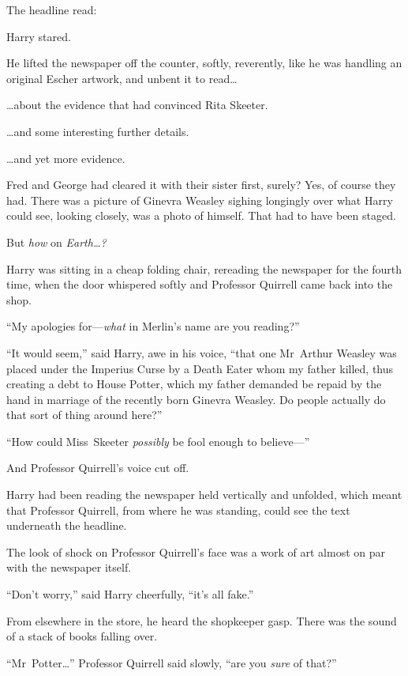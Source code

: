 The headline read:


Harry stared.

He lifted the newspaper off the counter, softly, reverently, like he was handling an original Escher artwork, and unbent it to read…

…about the evidence that had convinced Rita Skeeter.

…and some interesting further details.

…and yet more evidence.

Fred and George had cleared it with their sister first, surely? Yes, of course they had. There was a picture of Ginevra Weasley sighing longingly over what Harry could see, looking closely, was a photo of himself. That had to have been staged.

But \emph{how} on \emph{Earth…?}

Harry was sitting in a cheap folding chair, rereading the newspaper for the fourth time, when the door whispered softly and Professor Quirrell came back into the shop.

“My apologies for—\emph{what} in Merlin’s name are you reading?”

“It would seem,” said Harry, awe in his voice, “that one Mr~Arthur Weasley was placed under the Imperius Curse by a Death Eater whom my father killed, thus creating a debt to House Potter, which my father demanded be repaid by the hand in marriage of the recently born Ginevra Weasley. Do people actually do that sort of thing around here?”

“How could Miss~Skeeter \emph{possibly} be fool enough to believe—”

And Professor Quirrell’s voice cut off.

Harry had been reading the newspaper held vertically and unfolded, which meant that Professor Quirrell, from where he was standing, could see the text underneath the headline.

The look of shock on Professor Quirrell’s face was a work of art almost on par with the newspaper itself.

“Don’t worry,” said Harry cheerfully, “it’s all fake.”

From elsewhere in the store, he heard the shopkeeper gasp. There was the sound of a stack of books falling over.

“Mr~Potter…” Professor Quirrell said slowly, “are you \emph{sure} of that?”


